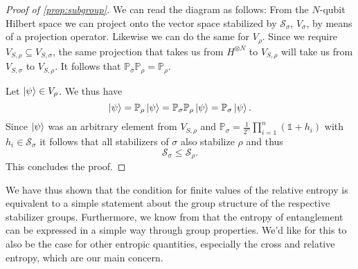 \begin{proof}[Proof of \cref{prop:subgroup}]
  We can read the diagram as follows: From the $N$-qubit Hilbert space we can
  project onto the vector space stabilized by $\mathcal{S}_\sigma$, $V_\sigma$, by means of a
  projection operator. Likewise we can do the same for $V_\rho$. Since we
  require $V_{S,\rho} \subseteq V_{S,\sigma}$, the same projection that takes
  us from $H^{\otimes N}$ to $V_{S,\rho}$ will take us from $V_{S,\sigma}$ to
  $V_{S,\rho}$. It follows that $\mathbb{P}_\sigma \mathbb{P}_\rho = \mathbb{P}_\rho$.

  Let $\ket{\psi} \in V_\rho$. We thus have
  \[
    \ket{\psi} = \mathbb{P}_\rho \ket{\psi} = \mathbb{P}_\sigma \mathbb{P}_\rho
    \ket{\psi} = \mathbb{P}_\sigma
    \ket{\psi}.
  \]
  Since $\ket{\psi}$ was an arbitrary element from $V_{S,\rho}$ and $\mathbb{P}_\sigma =
  \frac{1}{2^n} \prod_{i=1}^n \left(\mathds{1} + h_i\right)$ with $h_i \in
  \mathcal{S}_\sigma$ it follows that all stabilizers of $\sigma$ also stabilize $\rho$
  and thus
  \[
    \mathcal{S}_\sigma \leq \mathcal{S}_\rho.
  \]
  This concludes the proof.
\end{proof}
We have thus shown that the condition for finite values of the relative
entropy is equivalent to a simple statement about the group structure of the
respective stabilizer groups. Furthermore, we know from 
\cite{fattalEntanglementStabilizerFormalism2004} that the entropy of
entanglement can be expressed in a simple way through group properties.
We'd like for this to also be the case for other entropic quantities,
especially the cross and relative entropy, which are our main concern.

